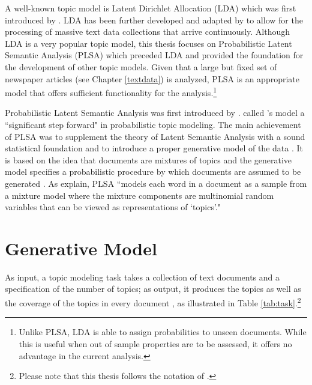 \documentclass[11pt,a4paper,english,oneside]{book}
\numberwithin{equation}{chapter}
\begin{document}
A well-known topic model is Latent Dirichlet Allocation (LDA) which was first introduced by \cite{Blei.2003}. LDA has been further developed and adapted by \cite{Hoffman2010} to allow for the processing of massive text data collections that arrive continuously. Although LDA is a very popular topic model, this thesis focuses on Probabilistic Latent Semantic Analysis (PLSA) which preceded LDA and provided the foundation for the development of other topic models. Given that a large but fixed set of newspaper articles (see Chapter \ref{textdata}) is analyzed, PLSA is an appropriate model that offers sufficient functionality for the analysis.\footnote{Unlike PLSA, LDA is able to assign probabilities to unseen documents. While this is useful when out of sample properties are to be assessed, it offers no advantage in the current analysis.}

Probabilistic Latent Semantic Analysis was first introduced by \cite{Hofmann.1999}. \citet[p.~994]{Blei.2003} called \citeauthor{Hofmann.1999}'s model a ``significant step forward" in probabilistic topic modeling. The main achievement of PLSA was to supplement the theory of Latent Semantic Analysis with a sound statistical foundation and to introduce a proper generative model of the data \cite[p. 289]{Hofmann.1999}. It is based on the idea that documents are mixtures of topics and the generative model specifies a probabilistic procedure by which documents are assumed to be generated \cite[p.~2]{Steyvers(2007)}. As \citet[p. 994]{Blei.2003} explain, PLSA ``models each word in a document as a sample from a mixture model where the mixture components are multinomial random variables that can be viewed as representations of `topics'."


\section{Generative Model}\label{GM}
As input, a topic modeling task takes a collection of text documents and a specification of the number of topics; as output, it produces the topics as well as the coverage  of the topics in every document \cite[pp.~330--331]{Zhai.2016}, as illustrated in Table \ref{tab:task}.\footnote{Please note that this thesis follows the notation of \cite{Zhai.2016}.} 
	
\end{document}
